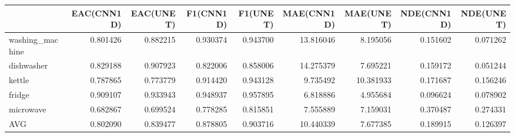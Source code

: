 \begin{tabular}{lrrrrrrrr}
\toprule
{} &  EAC(CNN1D) &  EAC(UNET) &  F1(CNN1D) &  F1(UNET) &  MAE(CNN1D) &  MAE(UNET) &  NDE(CNN1D) &  NDE(UNET) \\
\midrule
washing\_machine &    0.801426 &   0.882215 &   0.930374 &  0.943700 &   13.816046 &   8.195056 &    0.151602 &   0.071262 \\
dishwasher      &    0.829188 &   0.907923 &   0.822006 &  0.858006 &   14.275379 &   7.695221 &    0.159172 &   0.051244 \\
kettle          &    0.787865 &   0.773779 &   0.914420 &  0.943128 &    9.735492 &  10.381933 &    0.171687 &   0.156246 \\
fridge          &    0.909107 &   0.933943 &   0.948937 &  0.957895 &    6.818886 &   4.955684 &    0.096624 &   0.078902 \\
microwave       &    0.682867 &   0.699524 &   0.778285 &  0.815851 &    7.555889 &   7.159031 &    0.370487 &   0.274331 \\
AVG             &    0.802090 &   0.839477 &   0.878805 &  0.903716 &   10.440339 &   7.677385 &    0.189915 &   0.126397 \\
\bottomrule
\end{tabular}
